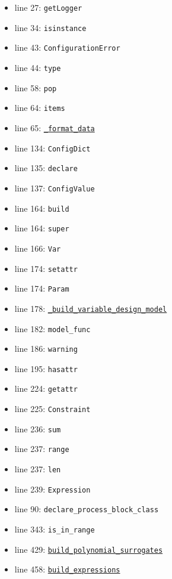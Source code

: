 \documentclass[11pt]{report}
\begin{document}
\begin{itemize}[leftmargin=*]
  \item line 27: \texttt{getLogger}
  \item line 34: \texttt{isinstance}
  \item line 43: \texttt{ConfigurationError}
  \item line 44: \texttt{type}
  \item line 58: \texttt{pop}
  \item line 64: \texttt{items}
  \item line 65: \hyperref[def:pricetaker-design_and_operation_models.py:_format_data:L30]{\texttt{\_format\_data}}
  \item line 134: \texttt{ConfigDict}
  \item line 135: \texttt{declare}
  \item line 137: \texttt{ConfigValue}
  \item line 164: \texttt{build}
  \item line 164: \texttt{super}
  \item line 166: \texttt{Var}
  \item line 174: \texttt{setattr}
  \item line 174: \texttt{Param}
  \item line 178: \hyperref[def:pricetaker-design_and_operation_models.py:DesignModelData._build_variable_design_model:L209]{\texttt{\_build\_variable\_design\_model}}
  \item line 182: \texttt{model\_func}
  \item line 186: \texttt{warning}
  \item line 195: \texttt{hasattr}
  \item line 224: \texttt{getattr}
  \item line 225: \texttt{Constraint}
  \item line 236: \texttt{sum}
  \item line 237: \texttt{range}
  \item line 237: \texttt{len}
  \item line 239: \texttt{Expression}
  \item line 90: \texttt{declare\_process\_block\_class}
  \item line 343: \texttt{is\_in\_range}
  \item line 429: \hyperref[def:pricetaker-design_and_operation_models.py:OperationModelData.build_polynomial_surrogates:L449]{\texttt{build\_polynomial\_surrogates}}
  \item line 458: \hyperref[def:pricetaker-design_and_operation_models.py:OperationModelData.build_expressions:L460]{\texttt{build\_expressions}}

\end{itemize}
\end{document}
